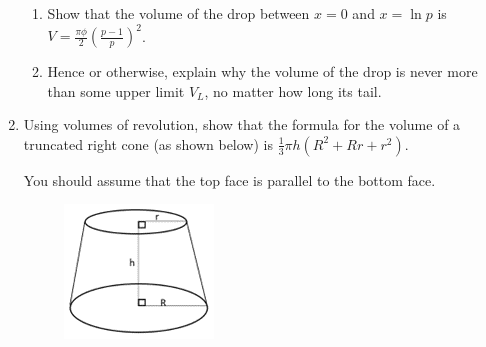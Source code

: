 \documentclass[../main.tex]{subfiles}
\begin{document}
\begin{enumerate}[itemsep=0.7cm]
    \begin{enumerate}
        \item Show that the volume of the drop between $x=0$ and $x=\ln{p}$ is $V=\frac{\pi \phi}{2}(\frac{p-1}{p})^2$.

        \item Hence or otherwise, explain why the volume of the drop is never more than some upper limit $V_L$, no matter how long its tail.
    \end{enumerate}
        
    \pagebreak
    \item 
    Using volumes of revolution, show that the formula for the volume of a truncated right cone (as shown below) is $\frac{1}{3}\pi h(R^2 + Rr + r^2)$.

    You should assume that the top face is parallel to the bottom face.

    \begin{figure}[h]
        \centering
        \includegraphics{images/volrev19.png}
    \end{figure}

\end{enumerate}


\pagebreak
\end{document}
